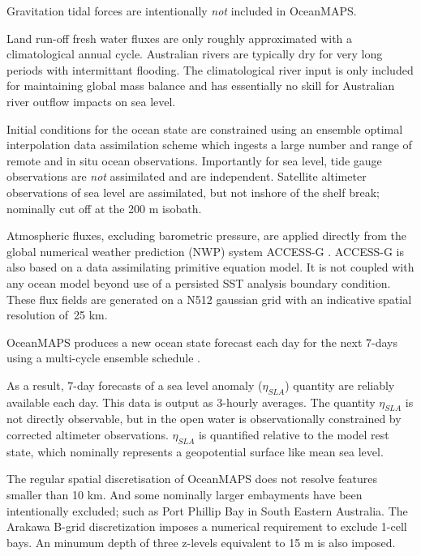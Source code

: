 \documentclass[jmse,article,accept,moreauthors,pdftex,10pt,a4paper]{mdpi}
\begin{document}
Gravitation tidal forces are intentionally \textit{not} included in OceanMAPS.      


Land run-off fresh water fluxes are only roughly approximated with a climatological annual cycle. 
Australian rivers are typically dry for very long periods with intermittant flooding.   
The climatological river input is only included for maintaining global mass balance and has essentially no skill for Australian river outflow impacts on sea level.    


Initial conditions for the ocean state are constrained using an ensemble optimal interpolation data assimilation scheme \cite{Oke:2008wr} which ingests a large number and range of remote and in situ ocean observations. 
Importantly for sea level, tide gauge observations are \textit{not} assimilated and are independent.   
Satellite altimeter observations of sea level are assimilated, but not inshore of the shelf break; nominally cut off at the 200 m isobath.


Atmospheric fluxes, excluding barometric pressure, are applied directly from the global numerical weather prediction (NWP) system ACCESS-G \cite{BureauofMeterology:C8IaJ2Qq}.
ACCESS-G is also based on a data assimilating primitive equation model.
It is not coupled with any ocean model beyond use of a persisted SST analysis boundary condition.
These flux fields are generated on a N512 gaussian grid with an indicative spatial resolution of~25 km. 

OceanMAPS produces a new ocean state forecast each day for the next 7-days using a multi-cycle ensemble schedule \cite{GaryBBrassington:2013jw}.

As a result, 7-day forecasts of a sea level anomaly ($\eta_{SLA}$) quantity are reliably available each day.  
This data is output as 3-hourly averages.  
The quantity $\eta_{SLA}$ is not directly observable, but in the open water is observationally constrained by corrected altimeter observations.
$\eta_{SLA}$ is quantified relative to the model rest state, which nominally represents a geopotential surface like mean sea level.  

The regular spatial discretisation of OceanMAPS does not resolve features smaller than 10 km.   
And some nominally larger embayments have been intentionally excluded; such as Port Phillip Bay in South Eastern Australia.
The Arakawa B-grid discretization imposes a numerical requirement to exclude 1-cell bays. 
An minumum depth of three z-levels equivalent to 15 m is also imposed.
\end{document}
